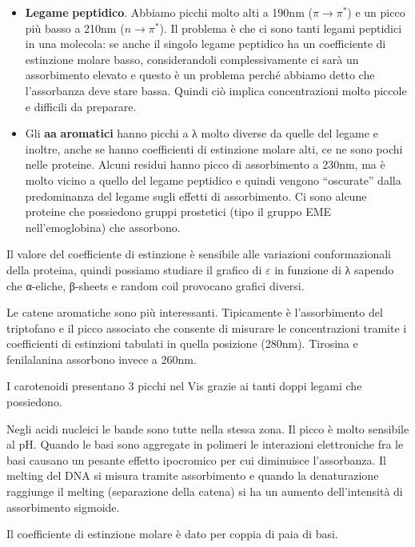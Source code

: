 \begin{itemize}
\item
  \textbf{Legame} \textbf{peptidico}. Abbiamo picchi molto alti a 190nm
  (\(\pi \rightarrow \pi^{*}\)) e un picco più basso a 210nm
  (\(n \rightarrow \pi^{*}\)). Il problema è che ci sono tanti legami
  peptidici in una molecola: se anche il singolo legame peptidico ha un
  coefficiente di estinzione molare basso, considerandoli
  complessivamente ci sarà un assorbimento elevato e questo è un
  problema perché abbiamo detto che l'assorbanza deve stare bassa.
  Quindi ciò implica concentrazioni molto piccole e difficili da
  preparare.
\item
  Gli \textbf{aa} \textbf{aromatici} hanno picchi a λ molto diverse da
  quelle del legame e inoltre, anche se hanno coefficienti di estinzione
  molare alti, ce ne sono pochi nelle proteine. Alcuni residui hanno
  picco di assorbimento a 230nm, ma è molto vicino a quello del legame
  peptidico e quindi vengono ``oscurate'' dalla predominanza del legame
  sugli effetti di assorbimento. Ci sono alcune proteine che possiedono
  gruppi prostetici (tipo il gruppo EME nell'emoglobina) che assorbono.
\end{itemize}

Il valore del coefficiente di estinzione è sensibile alle variazioni
conformazionali della proteina, quindi possiamo studiare il grafico di
\(\varepsilon\) in funzione di λ sapendo che α-eliche, β-sheets e random
coil provocano grafici diversi.

Le catene aromatiche sono più interessanti. Tipicamente è l'assorbimento
del triptofano e il picco associato che consente di misurare le
concentrazioni tramite i coefficienti di estinzioni tabulati in quella
posizione (280nm). Tirosina e fenilalanina assorbono invece a 260nm.

I carotenoidi presentano 3 picchi nel Vis grazie ai tanti doppi legami
che possiedono.

Negli acidi nucleici le bande sono tutte nella stessa zona. Il picco è
molto sensibile al pH. Quando le basi sono aggregate in polimeri le
interazioni elettroniche fra le basi causano un pesante effetto
ipocromico per cui diminuisce l'assorbanza. Il melting del DNA si misura
tramite assorbimento e quando la denaturazione raggiunge il melting
(separazione della catena) si ha un aumento dell'intensità di
assorbimento sigmoide.

Il coefficiente di estinzione molare è dato per coppia di paia di basi.


